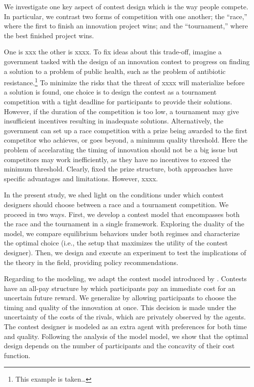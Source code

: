 \documentclass[12pt,]{article}
\theoremstyle{plain} %
\begin{document}
We investigate one key aspect of contest design which is the way people
compete. In particular, we contrast two forms of competition with one
another; the ``race,'' where the first to finish an innovation project
wins; and the ``tournament,'' where the best finished project wins.

One is xxx the other is xxxx. To fix ideas about this trade-off, imagine
a government tasked with the design of an innovation contest to progress
on finding a solution to a problem of public health, such as the problem
of antibiotic resistance.\footnote{This example is taken\ldots{}} To
minimize the risks that the threat of xxxx will materialize before a
solution is found, one choice is to design the contest as a tournament
competition with a tight deadline for participants to provide their
solutions. However, if the duration of the competition is too low, a
tournament may give insufficient incentives resulting in inadequate
solutions. Alternatively, the government can set up a race competition
with a prize being awarded to the first competitor who achieves, or goes
beyond, a minimum quality threshold. Here the problem of accelarating
the timing of innovation should not be a big issue but competitors may
work inefficiently, as they have no incentives to exceed the minimum
threshold. Clearly, fixed the prize structure, both approaches have
specific advantages and limitations. However, xxxx.

In the present study, we shed light on the conditions under which
contest designers should choose between a race and a tournament
competition. We proceed in two ways. First, we develop a contest model
that encompasses both the race and the tournament in a single framework.
Exploring the duality of the model, we compare equilibrium behaviors
under both regimes and characterize the optimal choice (i.e., the setup
that maximizes the utility of the contest designer). Then, we design and
execute an experiment to test the implications of the theory in the
field, providing policy recommendations.

Regarding to the modeling, we adapt the contest model introduced by
\citet{moldovanu2001optimal}. Contests have an all-pay structure by
which participants pay an immediate cost for an uncertain future reward.
We generalize by allowing participants to choose the timing and quality
of the innovation at once. This decision is made under the uncertainty
of the costs of the rivals, which are privately observed by the agents.
The contest designer is modeled as an extra agent with preferences for
both time and quality. Following the analysis of the model model, we
show that the optimal design depends on the number of participants and
the concavity of their cost function.
\end{document}
